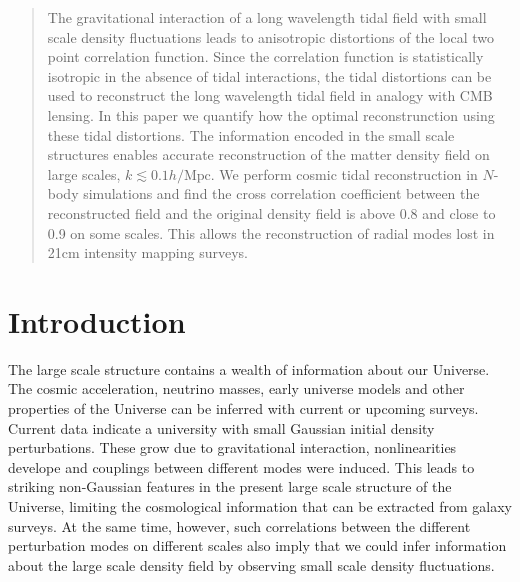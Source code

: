 \documentclass[aps,prd,twocolumn,showpacs,superscriptaddress,groupedaddress,nofootinbib]{revtex4}  %
\newcommand{\mr}{\mathrm}
\begin{document}
\begin{abstract}
The gravitational interaction of a long wavelength tidal field with
small scale density fluctuations leads to anisotropic distortions of the local 
two point correlation function.
Since the correlation function is statistically 
isotropic in the absence of tidal interactions, the tidal distortions
can be used to reconstruct the long wavelength tidal field in analogy with
CMB lensing.
In this paper we quantify how the optimal reconstrunction using these
tidal distortions.
The information encoded in the small scale structures enables accurate
reconstruction of the matter density field on large scales, 
$k\lesssim0.1h/\mr{Mpc}$.
We perform cosmic tidal reconstruction in $N$-body simulations and find the 
cross correlation coefficient between the reconstructed field and the original
density field is above 0.8 and close to 0.9 on some scales.
This allows the reconstruction of radial modes lost in 21cm intensity mapping
surveys.

\end{abstract}

\pacs{}
\maketitle

\section{Introduction}
The large scale structure contains a wealth of information about our Universe.
The cosmic acceleration, neutrino masses, early universe models and  
other properties of the Universe can  be inferred with current or upcoming surveys.
Current data indicate a university with small Gaussian initial density perturbations. 
These grow due to gravitational interaction, nonlinearities develope and couplings 
between different modes were induced.
This leads to striking non-Gaussian features in the present large scale structure
of the Universe, limiting the cosmological information that can be extracted 
from galaxy surveys.
At the same time, however, such correlations between the different
perturbation modes on different scales also imply that we could infer information about the large scale  
density field by observing small scale density fluctuations.
\end{document}
